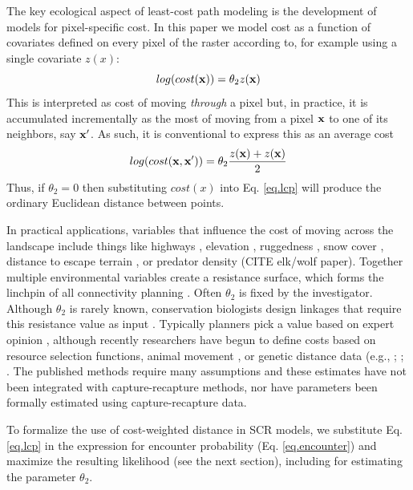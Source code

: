 \documentclass[12pt]{article}
\begin{document}
The key ecological aspect of least-cost path modeling is the
development 
of models for pixel-specific cost. 
In this paper we model cost as a function of covariates
defined on every pixel of the raster according to, for example using a
single covariate $z(x)$:
\begin{equation}
 log(cost({\bf x}))=  \theta_{2} z({\bf x})
\label{eq.cost}
\end{equation}
This is interpreted as cost of moving {\it through} a pixel but, in practice, it is accumulated 
incrementally as the most of moving from a pixel ${\bf x}$ to one of its neighbors, say ${\bf x}'$. As such, it is conventional
to express this as an average cost 
\[
 log(cost({\bf x},{\bf x}'))=  \theta_{2} \frac{z({\bf x})+z({\bf x})}{2}
\]
Thus, if $\theta_{2} = 0$ then substituting $cost(x)$ into
Eq. \ref{eq.lcp} will produce the ordinary Euclidean distance
between points.

In practical applications, variables that
influence the cost of moving across the landscape include things like
highways  \citep[e.g.,][]{epps_etal:2005}, elevation
\citep{cushman_etal:2006},
ruggedness \citep{epps_etal:2007}, snow cover \citep{schwartz_etal:2009},
distance to escape terrain \citep{shirk_etal:2010}, or predator density
(CITE elk/wolf paper).  Together multiple environmental variables create
a resistance surface, which forms the linchpin of all connectivity
planning \citep{spear_etal:2010}.  Often $\theta_{2}$ is fixed by the
investigator. Although
 $\theta_{2}$ is rarely known,
 conservation
biologists design linkages that require this resistance value as input
\citep{beier_etal:2008}.  Typically planners pick a value based on
expert opinion \citep{beier_etal:2007}, although recently researchers
have begun to define costs based on resource selection functions,
animal movement \citep{tracy:2006, dickenson_etal:2005}, or genetic
distance data (e.g., \citet{gerlach_musolf:2000};
\citet{epps_etal:2007}; \citet{schwartz_etal:2009}. The published
methods require many assumptions and these estimates have not been
integrated with capture-recapture methods, nor have parameters been
formally estimated using capture-recapture data.

To formalize the use of cost-weighted distance in SCR models, we
substitute Eq. \ref{eq.lcp} in the expression for encounter
probability (Eq. \ref{eq.encounter}) and maximize the resulting
likelihood (see the next section), including for estimating the
parameter $\theta_{2}$.
\end{document}
